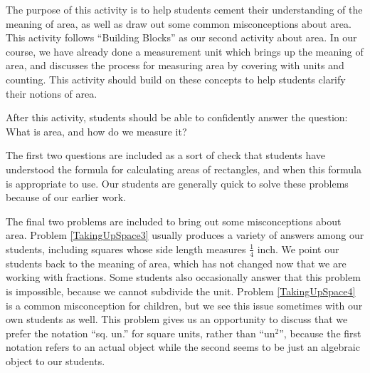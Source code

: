 \documentclass[nooutcomes]{ximera}
\begin{document}
\begin{instructorNotes}
The purpose of this activity is to help students cement their understanding of the meaning of area, as well as draw out some common misconceptions about area.  This activity follows ``Building Blocks'' as our second activity about area.  In our course, we have already done a measurement unit which brings up the meaning of area, and discusses the process for measuring area by covering with units and counting.  This activity should build on these concepts to help students clarify their notions of area.  

After this activity, students should be able to confidently answer the question: What is area, and how do we measure it?

The first two questions are included as a sort of check that students have understood the formula for calculating areas of rectangles, and when this formula is appropriate to use.  Our students are generally quick to solve these problems because of our earlier work.

The final two problems are included to bring out some misconceptions about area.  Problem \ref{TakingUpSpace3} usually produces a variety of answers among our students, including squares whose side length measures $\frac14$ inch.  We point our students back to the meaning of area, which has not changed now that we are working with fractions.  Some students also occasionally answer that this problem is impossible, because we cannot subdivide the unit.  Problem \ref{TakingUpSpace4} is a common misconception for children, but we see this issue sometimes with our own students as well.  This problem gives us an opportunity to discuss that we prefer the notation ``sq. un.'' for square units, rather than ``un$^2$'', because the first notation refers to an actual object while the second seems to be just an algebraic object to our students.


\end{instructorNotes}
\end{document}

